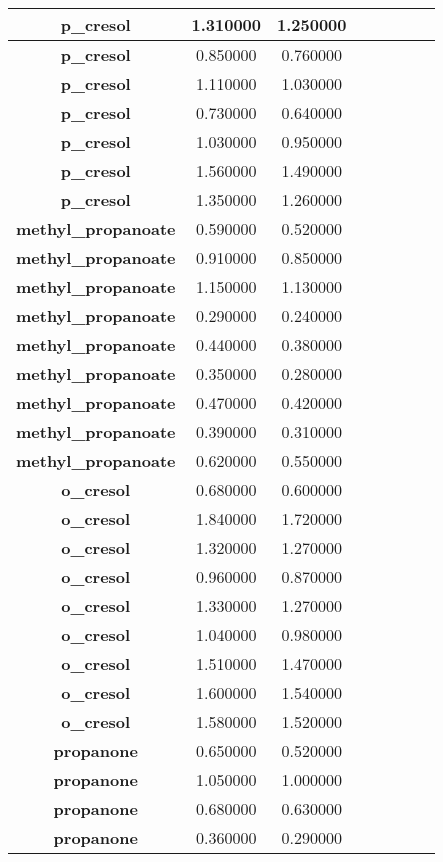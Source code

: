 \documentclass{amsart}
\begin{document}
\begin{center}
\begin{tabular}{c|c|c|c|c|c|c|c}
\textbf{p\_cresol}&1.310000&1.250000 \\ \hline 
\textbf{p\_cresol}&0.850000&0.760000 \\ \hline 
\textbf{p\_cresol}&1.110000&1.030000 \\ \hline 
\textbf{p\_cresol}&0.730000&0.640000 \\ \hline 
\textbf{p\_cresol}&1.030000&0.950000 \\ \hline 
\textbf{p\_cresol}&1.560000&1.490000 \\ \hline 
\textbf{p\_cresol}&1.350000&1.260000 \\ \hline 
\textbf{methyl\_propanoate}&0.590000&0.520000 \\ \hline 
\textbf{methyl\_propanoate}&0.910000&0.850000 \\ \hline 
\textbf{methyl\_propanoate}&1.150000&1.130000 \\ \hline 
\textbf{methyl\_propanoate}&0.290000&0.240000 \\ \hline 
\textbf{methyl\_propanoate}&0.440000&0.380000 \\ \hline 
\textbf{methyl\_propanoate}&0.350000&0.280000 \\ \hline 
\textbf{methyl\_propanoate}&0.470000&0.420000 \\ \hline 
\textbf{methyl\_propanoate}&0.390000&0.310000 \\ \hline 
\textbf{methyl\_propanoate}&0.620000&0.550000 \\ \hline 
\textbf{o\_cresol}&0.680000&0.600000 \\ \hline 
\textbf{o\_cresol}&1.840000&1.720000 \\ \hline 
\textbf{o\_cresol}&1.320000&1.270000 \\ \hline 
\textbf{o\_cresol}&0.960000&0.870000 \\ \hline 
\textbf{o\_cresol}&1.330000&1.270000 \\ \hline 
\textbf{o\_cresol}&1.040000&0.980000 \\ \hline 
\textbf{o\_cresol}&1.510000&1.470000 \\ \hline 
\textbf{o\_cresol}&1.600000&1.540000 \\ \hline 
\textbf{o\_cresol}&1.580000&1.520000 \\ \hline 
\textbf{propanone}&0.650000&0.520000 \\ \hline 
\textbf{propanone}&1.050000&1.000000 \\ \hline 
\textbf{propanone}&0.680000&0.630000 \\ \hline 
\textbf{propanone}&0.360000&0.290000 \\ \hline 

\end{tabular}
\end{center}
\end{document}
